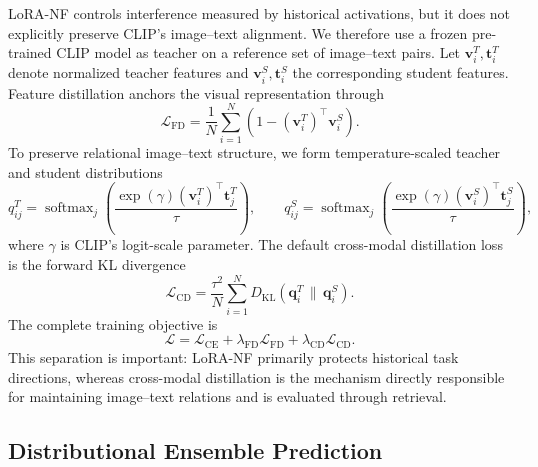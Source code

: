 LoRA-NF controls interference measured by historical activations, but it does not explicitly preserve CLIP's image--text alignment. We therefore use a frozen pre-trained CLIP model as teacher on a reference set of image--text pairs. Let $\mathbf{v}_i^T,\mathbf{t}_i^T$ denote normalized teacher features and $\mathbf{v}_i^S,\mathbf{t}_i^S$ the corresponding student features. Feature distillation anchors the visual representation through
\begin{equation}
    \mathcal{L}_{\mathrm{FD}}
    =\frac{1}{N}\sum_{i=1}^{N}\left(1-(\mathbf{v}_i^T)^\top\mathbf{v}_i^S\right).
    \label{eq:fd}
\end{equation}
To preserve relational image--text structure, we form temperature-scaled teacher and student distributions
\begin{equation}
    q_{ij}^{T}=\operatorname{softmax}_{j}\!\left(
      \frac{\exp(\gamma)(\mathbf{v}_i^T)^\top\mathbf{t}_j^T}{\tau}\right),
    \qquad
    q_{ij}^{S}=\operatorname{softmax}_{j}\!\left(
      \frac{\exp(\gamma)(\mathbf{v}_i^S)^\top\mathbf{t}_j^S}{\tau}\right),
    \label{eq:cross_modal_probs}
\end{equation}
where $\gamma$ is CLIP's logit-scale parameter. The default cross-modal distillation loss is the forward KL divergence
\begin{equation}
    \mathcal{L}_{\mathrm{CD}}
    =\frac{\tau^2}{N}\sum_{i=1}^{N}
      D_{\mathrm{KL}}(\mathbf{q}_i^T\,\|\,\mathbf{q}_i^S).
    \label{eq:cd}
\end{equation}
The complete training objective is
\begin{equation}
    \mathcal{L}
    =\mathcal{L}_{\mathrm{CE}}
    +\lambda_{\mathrm{FD}}\mathcal{L}_{\mathrm{FD}}
    +\lambda_{\mathrm{CD}}\mathcal{L}_{\mathrm{CD}}.
    \label{eq:training_objective}
\end{equation}
This separation is important: LoRA-NF primarily protects historical task directions, whereas cross-modal distillation is the mechanism directly responsible for maintaining image--text relations and is evaluated through retrieval.

\subsection{Distributional Ensemble Prediction}
\label{sec:ensemble}

